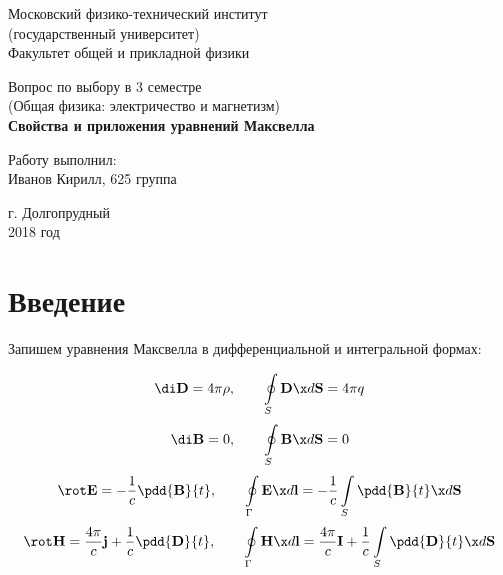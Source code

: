 \documentclass[12pt]{kiarticle}
\begin{document}
	
	\begin{titlepage}
	\begin{center}
		\large 	Московский физико-технический институт \\
		(государственный университет) \\
		Факультет общей и прикладной физики \\
		\vspace{0.2cm}
		
		\vspace{4.5cm}
		Вопрос по выбору в 3 семестре \\ \vspace{0.2cm}
		\large (Общая физика: электричество и магнетизм) \\ \vspace{0.2cm}
		\LARGE \textbf{Свойства и приложения уравнений Максвелла}
	\end{center}
	\vspace{2.3cm} \large
	
	\begin{center}
		Работу выполнил: \\
		Иванов Кирилл,
		625 группа
		\vspace{10mm}		
		
	\end{center}
	
	\begin{center} \vspace{60mm}
		г. Долгопрудный \\
		2018 год
	\end{center}
\end{titlepage}



\section{Введение}

Запишем уравнения Максвелла в дифференциальной и интегральной формах: 


\begin{equation}\label{Gauss_E}
\di \mathbf{D} = 4\pi\rho, \qquad
\oint\limits_S  \mathbf{D} \x d\mathbf{S} = 4\pi q
\end{equation}
\begin{equation}\label{Gauss_B}
\di \textbf{B} = 0 , \qquad
\oint\limits_S  \mathbf{B} \x d\mathbf{S} =  0
\end{equation}
\begin{equation}\label{Faradey}
\rot \mathbf{E} = -\dfrac{1}{c}\pdd{\mathbf{B}}{t}, \qquad \oint\limits_\Gamma \mathbf{E} \x d\mathbf{l} = - \dfrac{1}{c} \int\limits_S  \pdd{\mathbf{B}}{t} \x d\mathbf{S}
\end{equation}
\begin{equation}\label{Circ_H}
\rot \mathbf{H} = \dfrac{4\pi}{c}\mathbf{j} + \dfrac{1}{c}\pdd{\mathbf{D}}{t}, \qquad
\oint\limits_\Gamma \mathbf{H} \x d\mathbf{l} = \dfrac{4\pi}{c}\mathbf{I} + \dfrac{1}{c} \int\limits_S  \pdd{\mathbf{D}}{t} \x d\mathbf{S} 
\end{equation}
\end{document}

